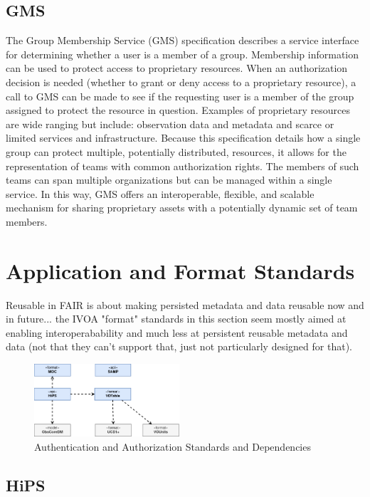 \documentclass[11pt,a4paper]{ivoa}
\begin{document}
\subsection{GMS}

The Group Membership Service (GMS) specification describes a service interface for determining 
whether a user is a member of a group. Membership information can be used to protect access to 
proprietary resources. When an authorization decision is needed (whether to grant or deny access 
to a proprietary resource), a call to GMS can be made to see if the requesting user is a member 
of the group assigned to protect the resource in question. Examples of proprietary resources are 
wide ranging but include: observation data and metadata and scarce or limited services and 
infrastructure. Because this specification details how a single group can protect multiple, 
potentially distributed, resources, it allows for the representation of teams with common 
authorization rights. The members of such teams can span multiple organizations but can be 
managed within a single service. In this way, GMS offers an interoperable, flexible, and 
scalable mechanism for sharing proprietary assets with a potentially dynamic set of team members. 

\section{Application and Format Standards}

Reusable in FAIR is about making persisted metadata and data reusable now and in future... 
the IVOA "format" standards in this section seem mostly aimed at enabling interoperabability
and much less at persistent reusable metadata and data (not that they can't support that, 
just not particularly designed for that).

\begin{figure}[h]
\centering
\includegraphics[width=0.48\textwidth]{ivoa-arch-apps.png}
\caption{Authentication and Authorization Standards and Dependencies}
\label{fig:appsdeps}
\end{figure}

\subsection{HiPS}
\end{document}
